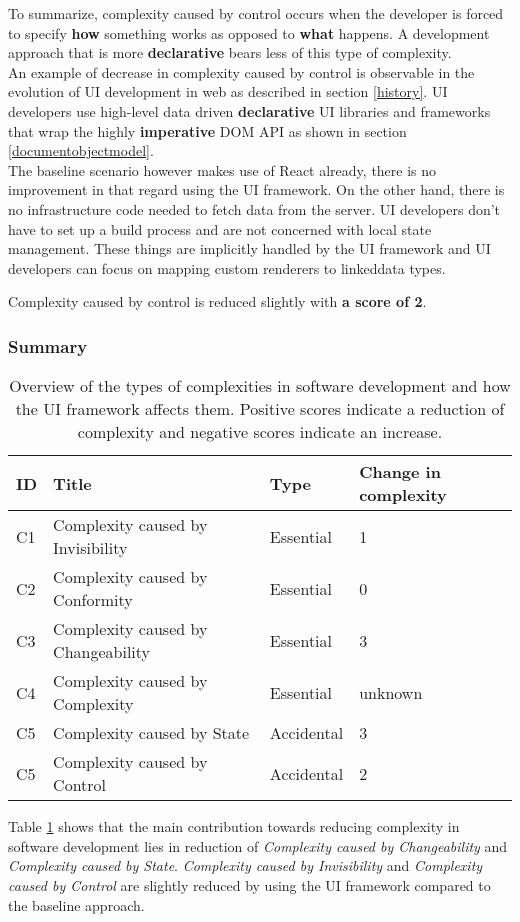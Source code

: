 To summarize, complexity caused by control occurs when the developer is forced to specify \textbf{how} something works as opposed to \textbf{what} happens. A development approach that is more \textbf{declarative} bears less of this type of complexity. \\
An example of decrease in complexity caused by control is observable in the evolution of UI development in web as described in section \ref{history}. UI developers use high-level data driven \textbf{declarative} UI libraries and frameworks that wrap the highly \textbf{imperative} DOM API as shown in section \ref{documentobjectmodel}. \\
The baseline scenario however makes use of React already, there is no improvement in that regard using the UI framework. On the other hand, there is no infrastructure code needed to fetch data from the server. UI developers don't have to set up a build process and are not concerned with local state management. These things are implicitly handled by the UI framework and UI developers can focus on mapping custom renderers to \gls{linkeddata} types.

Complexity caused by control is reduced slightly with \textbf{a score of 2}.

\subsubsection{Summary}

\begin{table}[!htb]
  \begin{center}
    \begin{tabular}{|l|l|l|l|}
      \hline
      \textbf{ID} & \textbf{Title} & \textbf{Type} & \textbf{Change in complexity} \\
      \hline
      C1 & Complexity caused by Invisibility & Essential & 1 \\
      \hline
      C2 & Complexity caused by Conformity & Essential & 0 \\
      \hline
      C3 & Complexity caused by Changeability & Essential & 3 \\
      \hline
      C4 & Complexity caused by Complexity & Essential & unknown \\
      \hline
      C5 & Complexity caused by State & Accidental & 3 \\
      \hline
      C5 & Complexity caused by Control & Accidental & 2 \\
      \hline
    \end{tabular}
    \caption{Overview of the types of complexities in software development and how the UI framework affects them. Positive scores indicate a reduction of complexity and negative scores indicate an increase.}
    \label{tab:complexitysummary}
  \end{center}
\end{table}

Table \ref{tab:complexitysummary} shows that the main contribution towards reducing complexity in software development lies in reduction of \textit{Complexity caused by Changeability} and \textit{Complexity caused by State}. \textit{Complexity caused by Invisibility} and \textit{Complexity caused by Control} are slightly reduced by using the UI framework compared to the baseline approach.
